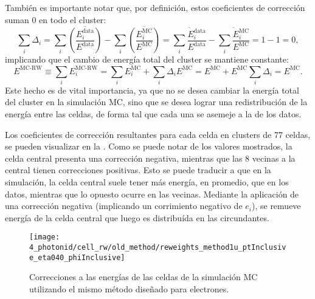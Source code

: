 Tambi\'en es importante notar que, por definición, estos coeficientes de corrección suman 0 en todo el cluster:
\begin{equation*}
    \sum_i \Delta_i = \sum_i \overline{\left( \frac{ E_i^{\text{data}} }{ E^{\text{data}} } \right)} - \sum_i \overline{\left( \frac{ E_i^{\text{MC}} }{ E^{\text{MC}} } \right)}
    = \overline{\sum_i \frac{ E_i^{\text{data}} }{ E^{\text{data}} }} - \overline{\sum_i \frac{ E_i^{\text{MC}} }{ E^{\text{MC}} }}
    = 1 - 1 = 0,
\end{equation*}
implicando que el cambio de energ\'ia total del cluster se mantiene constante:
\begin{equation*}
    E^{\text{MC-RW}} \equiv \sum_i E_i^{\text{MC-RW}}
    = \sum_i E_i^{\text{MC}} + \sum_i \Delta_i E^{\text{MC}} = E^{\text{MC}} + E^{\text{MC}} \sum_i \Delta_i = E^{\text{MC}}.
\end{equation*}
Este hecho es de vital importancia, ya que no se desea cambiar la energ\'ia total del cluster en la simulaci\'on \ac{MC}, sino que se desea lograr una redistribuci\'on de la energ\'ia entre las celdas, de forma tal que cada una se asemeje a la de los datos.

Los coeficientes de correcci\'on resultantes para cada celda en clusters de 77 celdas, se pueden visualizar en la \Fig{\ref{fig:ss_corrections:cell_rw:calculation:previous:reweights}}. Como se puede notar de los valores mostrados, la celda central presenta una correcci\'on negativa, mientras que las 8 vecinas a la central tienen correcciones positivas. Esto se puede traducir a que en la simulaci\'on, la celda central suele tener m\'as energ\'ia, en promedio, que en los datos, mientras que lo opuesto ocurre en las vecinas. Mediante la aplicaci\'on de una correcci\'on negativa (implicando un corrimiento negativo de \(e_i\)), se remueve energ\'ia de la celda central que luego es distribu\'ida en las circundantes.

\begin{figure}[htbp]
    \centering
    \texttt{[image: 4\_photonid/cell\_rw/old\_method/reweights\_method1u\_ptInclusive\_eta040\_phiInclusive]}
    \caption{Correcciones a las energ\'ias de las celdas de la simulaci\'on \ac{MC} utilizando el mismo m\'etodo dise\~nado para electrones. }
    \label{fig:ss_corrections:cell_rw:calculation:previous:reweights}
\end{figure}

